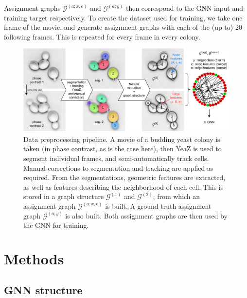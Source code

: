 \documentclass[10pt,conference,compsocconf,a4paper]{IEEEtran}
\newcommand{\G}{\mathcal{G}}
\begin{document}
		Assignment graphs $\G^{(a;x,e)}$ and $\G^{(a;y)}$ then correspond to the GNN input and training target respectively.
		To create the dataset used for training, we take one frame of the movie, and generate assignment graphs with each of the (up to) 20 following frames. This is repeated for every frame in every colony.

		\begin{figure}
			\centering
			\includegraphics[width=\linewidth]{figures/pipeline.v2.pdf}
			\caption{Data preprocessing pipeline. A movie of a budding yeast colony is taken (in phase contrast, as is the case here), then YeaZ \cite{dietler_convolutional_2020} is used to segment individual frames, and semi-automatically track cells. Manual corrections to segmentation and tracking are applied as required. From the segmentations, geometric features are extracted, as well as features describing the neighborhood of each cell. This is stored in a graph structure $\G^{(1)}$ and $\G^{(2)}$, from which an assignment graph $\G^{(a;x,e)}$ is built. A ground truth assignment graph $\G^{(a;y)}$ is also built. Both assignment graphs are then used by the GNN for training.}
			\label{fig:pipeline}
		\end{figure}


\section{Methods}

	\subsection{GNN structure}
\end{document}
